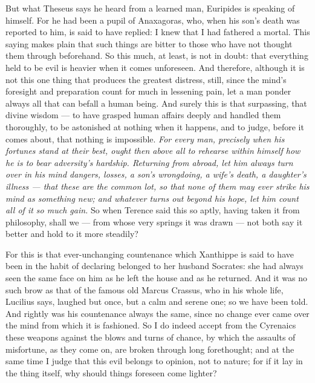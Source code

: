 But what Theseus says he heard from a learned man, Euripides is speaking of himself. For he had been a pupil of Anaxagoras, who, when his son's death was reported to him, is said to have replied: I knew that I had fathered a mortal. This saying makes plain that such things are bitter to those who have not thought them through beforehand. So this much, at least, is not in doubt: that everything held to be evil is heavier when it comes unforeseen. And therefore, although it is not this one thing that produces the greatest distress, still, since the mind's foresight and preparation count for much in lessening pain, let a man ponder always all that can befall a human being. And surely this is that surpassing, that divine wisdom — to have grasped human affairs deeply and handled them thoroughly, to be astonished at nothing when it happens, and to judge, before it comes about, that nothing is impossible. \textit{For every man, precisely when his fortunes stand at their best, ought then above all to rehearse within himself how he is to bear adversity's hardship. Returning from abroad, let him always turn over in his mind dangers, losses, a son's wrongdoing, a wife's death, a daughter's illness — that these are the common lot, so that none of them may ever strike his mind as something new; and whatever turns out beyond his hope, let him count all of it so much gain.} So when Terence said this so aptly, having taken it from philosophy, shall we — from whose very springs it was drawn — not both say it better and hold to it more steadily?

 For this is that ever-unchanging countenance which Xanthippe is said to have been in the habit of declaring belonged to her husband Socrates: she had always seen the same face on him as he left the house and as he returned. And it was no such brow as that of the famous old Marcus Crassus, who in his whole life, Lucilius says, laughed but once, but a calm and serene one; so we have been told. And rightly was his countenance always the same, since no change ever came over the mind from which it is fashioned. So I do indeed accept from the Cyrenaics these weapons against the blows and turns of chance, by which the assaults of misfortune, as they come on, are broken through long forethought; and at the same time I judge that this evil belongs to opinion, not to nature; for if it lay in the thing itself, why should things foreseen come lighter?

